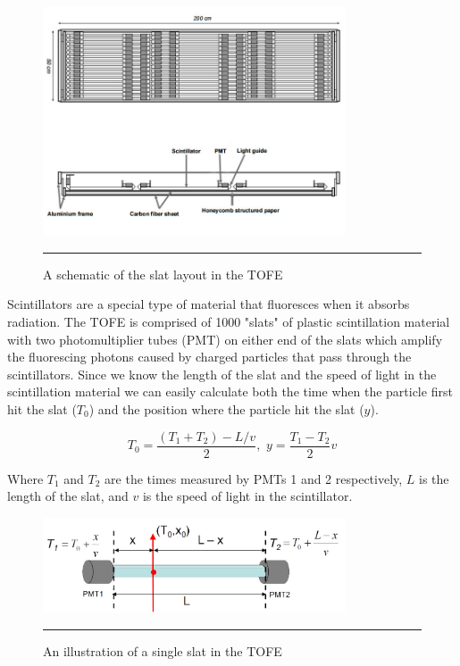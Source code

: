 \begin{figure}[htbp]
  \centering
    \includegraphics[width=0.8\textwidth]{Figures/TOFEschematic.jpg}
    \rule{35em}{0.5pt}
  \caption[A schematic of the slat layout in the TOFE]{A schematic of the slat layout in the TOFE}
  \label{fig:TOFEschematic}
\end{figure}

Scintillators are a special type of material that fluoresces when it absorbs radiation. The TOFE is comprised of 1000 "slats" of plastic scintillation material with two photomultiplier tubes (PMT) on either end of the slats which amplify the fluorescing photons caused by charged particles that pass through the scintillators. Since we know the length of the slat and the speed of light in the scintillation material we can easily calculate both the time when the particle first hit the slat ($T_{0}$) and the position where the particle hit the slat ($y$).

\begin{equation}
T_{0} = \frac{(T_{1}+T_{2})-L/v}{2} , \, \, y = \frac{T_{1}-T_{2}}{2} v
\end{equation}

Where $T_1$ and $T_{2}$ are the times measured by PMTs 1 and 2 respectively, $L$ is the length of the slat, and $v$ is the speed of light in the scintillator.

\begin{figure}[htbp]
  \centering
    \includegraphics[width=0.8\textwidth]{Figures/TOFEcartoon.jpg}
    \rule{35em}{0.5pt}
  \caption[An illustration of a single slat in the TOFE]{An illustration of a single slat in the TOFE}
  \label{fig:TOFEcartoon}
\end{figure}

